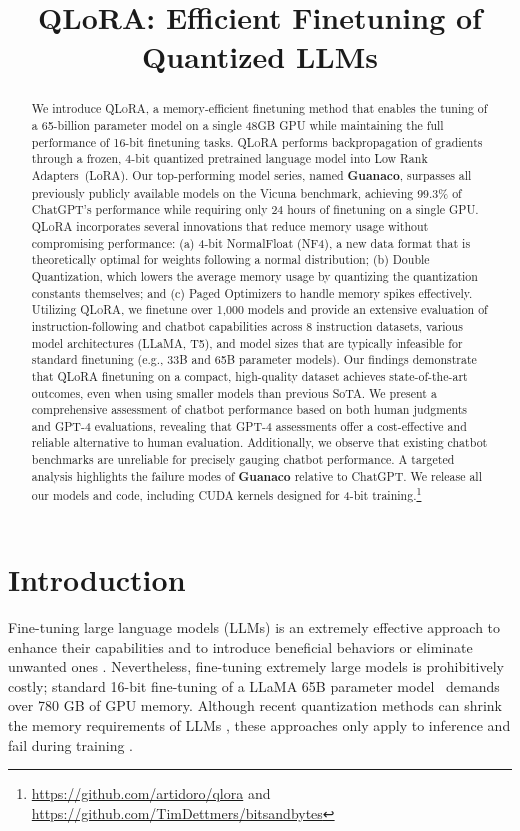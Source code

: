 \title{QLoRA: Efficient Finetuning of Quantized LLMs}

\begin{abstract}
We introduce \textsc{QLoRA}, a memory-efficient finetuning method that enables the tuning of a 65-billion parameter model on a single 48GB GPU while maintaining the full performance of 16-bit finetuning tasks. \textsc{QLoRA} performs backpropagation of gradients through a frozen, 4-bit quantized pretrained language model into Low Rank Adapters~(LoRA). Our top-performing model series, named \textbf{Guanaco}, surpasses all previously publicly available models on the Vicuna benchmark, achieving 99.3\% of ChatGPT’s performance while requiring only 24 hours of finetuning on a single GPU. \textsc{QLoRA} incorporates several innovations that reduce memory usage without compromising performance: (a) 4-bit NormalFloat (NF4), a new data format that is theoretically optimal for weights following a normal distribution; (b) Double Quantization, which lowers the average memory usage by quantizing the quantization constants themselves; and (c) Paged Optimizers to handle memory spikes effectively. Utilizing \textsc{QLoRA}, we finetune over 1,000 models and provide an extensive evaluation of instruction-following and chatbot capabilities across 8 instruction datasets, various model architectures (LLaMA, T5), and model sizes that are typically infeasible for standard finetuning (e.g., 33B and 65B parameter models). Our findings demonstrate that QLoRA finetuning on a compact, high-quality dataset achieves state-of-the-art outcomes, even when using smaller models than previous SoTA. We present a comprehensive assessment of chatbot performance based on both human judgments and GPT-4 evaluations, revealing that GPT-4 assessments offer a cost-effective and reliable alternative to human evaluation. Additionally, we observe that existing chatbot benchmarks are unreliable for precisely gauging chatbot performance. A targeted analysis highlights the failure modes of \textbf{Guanaco} relative to ChatGPT. We release all our models and code, including CUDA kernels designed for 4-bit training.\footnote{\url{https://github.com/artidoro/qlora} and \url{https://github.com/TimDettmers/bitsandbytes}}
\end{abstract}

\section{Introduction}

Fine-tuning large language models (LLMs) is an extremely effective approach to enhance their capabilities \citep{min2021metaicl, wei2021finetuned, ouyang2022training, wang2022super, wang2022self, liu2022few} and to introduce beneficial behaviors or eliminate unwanted ones \citep{ouyang2022training,askell2021general,bai2022training}. Nevertheless, fine-tuning extremely large models is prohibitively costly; standard 16-bit fine-tuning of a LLaMA 65B parameter model~\citep{touvron2023llama} demands over 780 GB of GPU memory. Although recent quantization methods can shrink the memory requirements of LLMs \citep{dettmers2022llm, dettmers2022case, frantar2022gptq, xiao2022smoothquant}, these approaches only apply to inference and fail during training \citep{wortsman2023stable}.

